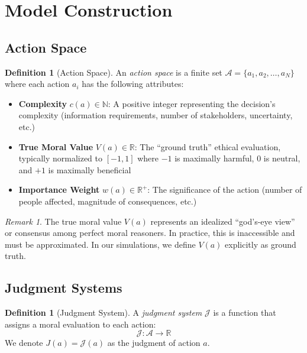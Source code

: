 \documentclass[12pt,a4paper]{article}
\theoremstyle{definition}
\newtheorem{definition}[theorem]{Definition}
\theoremstyle{remark}
\newtheorem{remark}[theorem]{Remark}
\begin{document}
\section{Model Construction}
\label{sec:formalization}

\subsection{Action Space}

\begin{definition}[Action Space]
An \emph{action space} is a finite set $\mathcal{A} = \{a_1, a_2, \ldots, a_N\}$ where each action $a_i$ has the following attributes:
\begin{itemize}
    \item \textbf{Complexity} $c(a) \in \mathbb{N}$: A positive integer representing the decision's complexity (information requirements, number of stakeholders, uncertainty, etc.)
    \item \textbf{True Moral Value} $V(a) \in \mathbb{R}$: The ``ground truth'' ethical evaluation, typically normalized to $[-1, 1]$ where $-1$ is maximally harmful, $0$ is neutral, and $+1$ is maximally beneficial
    \item \textbf{Importance Weight} $w(a) \in \mathbb{R}^+$: The significance of the action (number of people affected, magnitude of consequences, etc.)
\end{itemize}
\end{definition}

\begin{remark}
The true moral value $V(a)$ represents an idealized ``god's-eye view'' or consensus among perfect moral reasoners. In practice, this is inaccessible and must be approximated. In our simulations, we define $V(a)$ explicitly as ground truth.
\end{remark}

\subsection{Judgment Systems}

\begin{definition}[Judgment System]
A \emph{judgment system} $\mathcal{J}$ is a function that assigns a moral evaluation to each action:
\[
\mathcal{J}: \mathcal{A} \to \mathbb{R}
\]
We denote $J(a) = \mathcal{J}(a)$ as the judgment of action $a$.
\end{definition}
\end{document}
